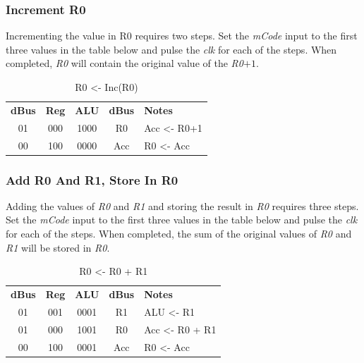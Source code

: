 \subsubsection{Increment R0}

Incrementing the value in R0 requires two steps. Set the \textit{mCode} input to the first three values in the table below and pulse the \textit{clk} for each of the steps. When completed, \textit{R0} will contain the original value of the \textit{R0}$ +1 $.

\begin{table}[H]
	\sffamily
	\newcommand{\head}[1]{\textcolor{white}{\textbf{#1}}}		
	\begin{center}
		\begin{tabular}{ccccl} 
			\textbf{dBus} & \textbf{Reg} & \textbf{ALU} & \textbf{dBus} & \textbf{Notes} \\
			01 & 000 & 1000 & R0 & Acc <- R0+1 \\
			00 & 100 & 0000 & Acc & R0 <- Acc \\
		\end{tabular}
	\end{center}
	\caption{R0 <- Inc(R0)}
	\label{tab:11-04}
\end{table}

\subsubsection{Add R0 And R1, Store In R0}

Adding the values of \textit{R0} and \textit{R1} and storing the result in \textit{R0} requires three steps. Set the \textit{mCode} input to the first three values in the table below and pulse the \textit{clk} for each of the steps. When completed, the sum of the original values of \textit{R0} and \textit{R1} will be stored in \textit{R0}.

\begin{table}[H]
	\sffamily
	\newcommand{\head}[1]{\textcolor{white}{\textbf{#1}}}		
	\begin{center}
		\begin{tabular}{ccccl} 
			\textbf{dBus} & \textbf{Reg} & \textbf{ALU} & \textbf{dBus} & \textbf{Notes} \\
			01 & 001 & 0001 & R1 & ALU <- R1 \\
			01 & 000 & 1001 & R0 & Acc <- R0 + R1 \\
			00 & 100 & 0001 & Acc & R0 <- Acc 
		\end{tabular}
	\end{center}
	\caption{R0 <- R0 + R1}
	\label{tab:11-05}
\end{table}

